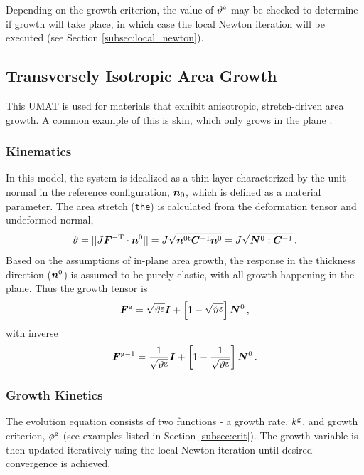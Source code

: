 \documentclass[10pt,letterpaper,oneside]{report}
\newcommand{\ten}[1]{\mbox{\boldmath $#1$}{}}
\newcommand{\scas}[1]{\mbox{{\scriptsize{${\rm{#1}}$}}}{}}
\begin{document}
\begin{itemize}
Depending on the growth criterion, the value of $\vartheta^{\scas{e}}$ may be checked to determine if growth will take place, in which case the local Newton iteration will be executed (see Section \ref{subsec:local_newton}).


\subsection{Transversely Isotropic Area Growth}
This UMAT is used for materials that exhibit anisotropic, stretch-driven area growth.  A common example of this is skin, which only grows in the plane \cite{BuganzaTepole2011, Zollner2013}.

\subsubsection{Kinematics}
In this model, the system is idealized as a thin layer characterized by the unit normal in the reference configuration, $\ten{n}_0$, which is defined as a material parameter.  The area stretch (\texttt{the}) is calculated from the deformation tensor and undeformed normal,
\begin{equation}
\vartheta = \vert\vert J \ten{F}^{-\scas{T}} \cdot \ten{n}^0 \vert\vert = J \sqrt{\ten{n}^{0 \scas{t}} \ten{C}^{-1} \ten{n}^0} = J \sqrt{\ten{N}^0 :  \ten{C}^{-1} } \, . 
\label{area_stretch}
\end{equation}
Based on the assumptions of in-plane area growth, the response in the thickness direction ($\ten{n}^0$) is assumed to be purely elastic, with all growth happening in the plane.  Thus the growth tensor is
\begin{equation}
\ten{F}^{\scas{g}} = \sqrt{\vartheta^{\scas{g}}} \ten{I} + \left[1-\sqrt{\vartheta^{\scas{g}}} \right] \ten{N}^0 \, , 
\end{equation}
with inverse 
\begin{equation}
\ten{F}^{\scas{g}-1} = \frac{1}{\sqrt{\vartheta^{\scas{g}}}} \ten{I} + \left[1-\frac{1}{\sqrt{\vartheta^{\scas{g}}}} \right] \ten{N}^0 \, . 
\end{equation}

\subsubsection{Growth Kinetics}
The evolution equation consists of two functions - a growth rate, $k^{\scas{g}}$, and growth criterion, $\phi^{\scas{g}}$ (see examples listed in Section \ref{subsec:crit}).  The growth variable is then updated iteratively using the local Newton iteration until desired convergence is achieved.


\end{itemize}
\end{document}
